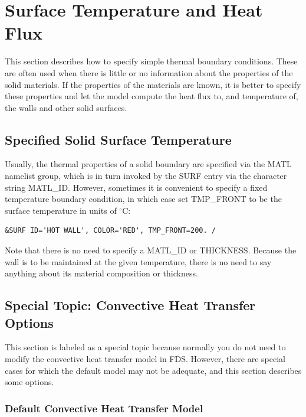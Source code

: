 \documentclass[11pt]{book}
\begin{document}
\clearpage

\section{Surface Temperature and Heat Flux}

This section describes how to specify simple thermal boundary conditions. These are often used when there is little or no
information about the properties of the solid materials. If the properties of the materials are known, it is better to specify these
properties and let the model compute the heat flux to, and temperature of, the walls and other solid surfaces.


\subsection{Specified Solid Surface Temperature}
\label{info:specified_temperature}

Usually, the thermal properties of a solid boundary are specified via the
{\ct MATL} namelist group, which is in turn invoked by the {\ct SURF} entry via
the character string {\ct MATL\_ID}. However, sometimes it is convenient to
specify a fixed temperature boundary condition, in which case set
{\ct TMP\_FRONT} to be the surface temperature in units of $^\circ$C:

\begin{lstlisting}
&SURF ID='HOT WALL', COLOR='RED', TMP_FRONT=200. /
\end{lstlisting}

\noindent
Note that there is no need to specify a {\ct MATL\_ID} or {\ct THICKNESS}. Because the wall is to be maintained at the given temperature,
there is no need to say anything about its material composition or thickness.



\subsection{Special Topic: Convective Heat Transfer Options}
\label{info:convection}

This section is labeled as a special topic because normally you do not need to modify the convective heat transfer
model in FDS. However, there are special cases for which the default model may not be adequate, and this section
describes some options.

\subsubsection{Default Convective Heat Transfer Model}
\end{document}
